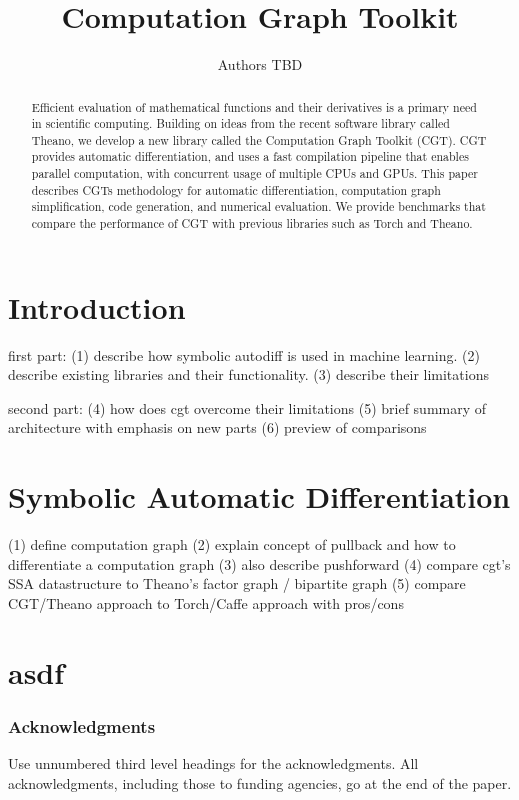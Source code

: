 \documentclass{article} %
\title{Computation Graph Toolkit}
\author{
Authors TBD
}
\begin{document}
\maketitle

\begin{abstract}

Efficient evaluation of mathematical functions and their derivatives is a primary need in scientific computing.
Building on ideas from the recent software library called Theano, we develop a new library called the Computation Graph Toolkit (CGT).
CGT provides automatic differentiation, and uses a fast compilation pipeline that enables parallel computation, 
with concurrent usage of multiple CPUs and GPUs.
This paper describes CGTs methodology for automatic differentiation, computation graph simplification, code generation, and numerical evaluation.
We provide benchmarks that compare the performance of CGT with previous libraries such as Torch and Theano.

\end{abstract}

\section{Introduction}

first part:
(1) describe how symbolic autodiff is used in machine learning. 
(2) describe existing libraries and their functionality.
(3) describe their limitations

second part:
(4) how does cgt overcome their limitations
(5) brief summary of architecture with emphasis on new parts
(6) preview of comparisons

\section{Symbolic Automatic Differentiation}

(1) define computation graph
(2) explain concept of pullback and how to differentiate a computation graph
(3) also describe pushforward
(4) compare cgt's SSA datastructure to Theano's factor graph / bipartite graph
(5) compare CGT/Theano approach to Torch/Caffe approach with pros/cons

\section{asdf}

\subsubsection*{Acknowledgments}

Use unnumbered third level headings for the acknowledgments. All
acknowledgments, including those to funding agencies, go at the end of the paper.



\end{document}
